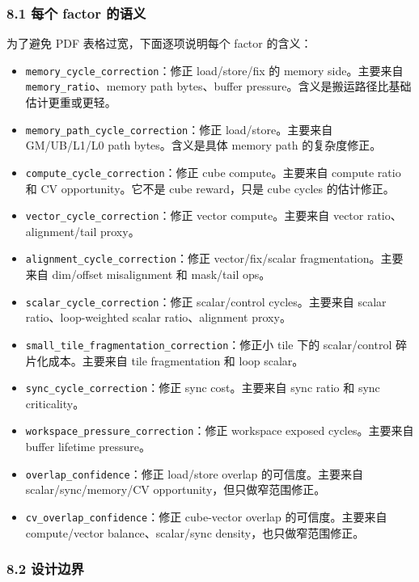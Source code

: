 \documentclass[
  10pt,
]{article}
\providecommand{\tightlist}{%
  \setlength{\itemsep}{0pt}\setlength{\parskip}{0pt}}
\begin{document}
\subsubsection{8.1 每个 factor
的语义}\label{ux6bcfux4e2a-factor-ux7684ux8bedux4e49}

为了避免 PDF 表格过宽，下面逐项说明每个 factor 的含义：

\begin{itemize}
\tightlist
\item
  \texttt{memory\_cycle\_correction}：修正 load/store/fix 的 memory
  side。主要来自 \texttt{memory\_ratio}、memory path bytes、buffer
  pressure。含义是搬运路径比基础估计更重或更轻。
\item
  \texttt{memory\_path\_cycle\_correction}：修正 load/store。主要来自
  GM/UB/L1/L0 path bytes。含义是具体 memory path 的复杂度修正。
\item
  \texttt{compute\_cycle\_correction}：修正 cube compute。主要来自
  compute ratio 和 CV opportunity。它不是 cube reward，只是 cube cycles
  的估计修正。
\item
  \texttt{vector\_cycle\_correction}：修正 vector compute。主要来自
  vector ratio、alignment/tail proxy。
\item
  \texttt{alignment\_cycle\_correction}：修正 vector/fix/scalar
  fragmentation。主要来自 dim/offset misalignment 和 mask/tail ops。
\item
  \texttt{scalar\_cycle\_correction}：修正 scalar/control
  cycles。主要来自 scalar ratio、loop-weighted scalar ratio、alignment
  proxy。
\item
  \texttt{small\_tile\_fragmentation\_correction}：修正小 tile 下的
  scalar/control 碎片化成本。主要来自 tile fragmentation 和 loop
  scalar。
\item
  \texttt{sync\_cycle\_correction}：修正 sync cost。主要来自 sync ratio
  和 sync criticality。
\item
  \texttt{workspace\_pressure\_correction}：修正 workspace exposed
  cycles。主要来自 buffer lifetime pressure。
\item
  \texttt{overlap\_confidence}：修正 load/store overlap
  的可信度。主要来自 scalar/sync/memory/CV
  opportunity，但只做窄范围修正。
\item
  \texttt{cv\_overlap\_confidence}：修正 cube-vector overlap
  的可信度。主要来自 compute/vector balance、scalar/sync
  density，也只做窄范围修正。
\end{itemize}

\subsubsection{8.2 设计边界}\label{ux8bbeux8ba1ux8fb9ux754c}
\end{document}
